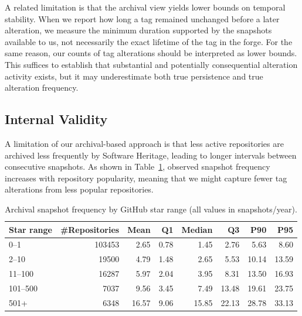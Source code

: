A related limitation is that the archival view yields lower bounds on temporal stability.
When we report how long a tag remained unchanged before a later alteration, we measure the minimum duration supported by the snapshots available to us, not necessarily the exact lifetime of the tag in the forge.
For the same reason, our counts of tag alterations should be interpreted as lower bounds.
This suffices to establish that substantial and potentially consequential alteration activity exists, but it may underestimate both true persistence and true alteration frequency.

\subsection{Internal Validity}
\label{subsec:tags-val-internal}

A limitation of our archival-based approach is that less active repositories are archived less frequently by Software Heritage, leading to longer intervals between consecutive snapshots.
As shown in Table~\ref{tab:tags-snapshot-frequency}, observed snapshot frequency increases with repository popularity, meaning that we might capture fewer tag alterations from less popular repositories.

\begin{table}[t]
\centering
\caption{Archival snapshot frequency by GitHub star range (all values in snapshots/year).}
\label{tab:tags-snapshot-frequency}
\begin{tabular}{lrrrrrrr}
\hline
\textbf{Star range} & \textbf{\#Repositories} & \textbf{Mean} & \textbf{Q1} & \textbf{Median} & \textbf{Q3} & \textbf{P90} & \textbf{P95} \\
\hline
0--1 & \num{103453} & \num{2.65} & \num{0.78} & \num{1.45} & \num{2.76} & \num{5.63} & \num{8.60} \\
2--10 & \num{19500} & \num{4.79} & \num{1.48} & \num{2.65} & \num{5.53} & \num{10.14} & \num{13.59} \\
11--100 & \num{16287} & \num{5.97} & \num{2.04} & \num{3.95} & \num{8.31} & \num{13.50} & \num{16.93} \\
101--500 & \num{7037} & \num{9.56} & \num{3.45} & \num{7.49} & \num{13.48} & \num{19.61} & \num{23.75} \\
501+ & \num{6348} & \num{16.57} & \num{9.06} & \num{15.85} & \num{22.13} & \num{28.78} & \num{33.13} \\
\hline
\end{tabular}
\end{table}

